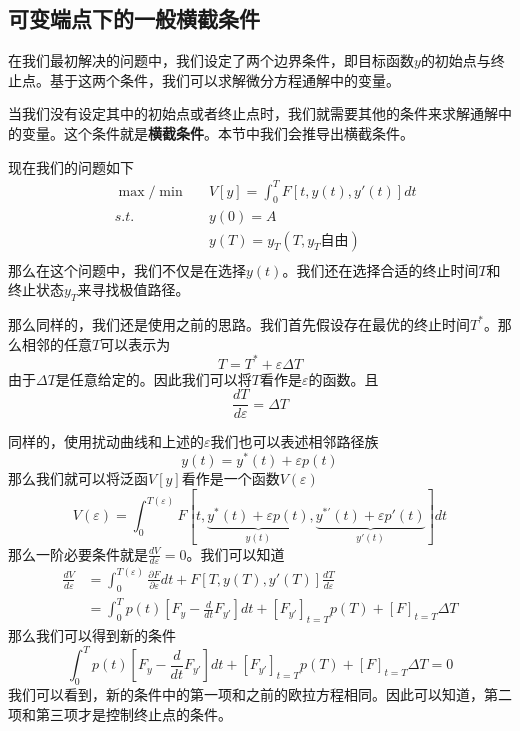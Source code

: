 \documentclass[UTF8,12pt]{ctexart}
\numberwithin{equation}{section} %
\numberwithin{figure}{section}
\numberwithin{table}{section}
\begin{document}
	\subsection{可变端点下的一般横截条件}
	在我们最初解决的问题中，我们设定了两个边界条件，即目标函数$y$的初始点与终止点。基于这两个条件，我们可以求解微分方程通解中的变量。
	
	当我们没有设定其中的初始点或者终止点时，我们就需要其他的条件来求解通解中的变量。这个条件就是\textbf{横截条件}。本节中我们会推导出横截条件。
	
	现在我们的问题如下
	\begin{equation}
		\begin{aligned}
			&\max / \min &&V[y] = \int_{0}^{T}F[t,y(t),y'(t)]dt \\
			&s.t. &&y(0) = A \\
			&  &&y(T) = y_T(T,y_T\text{自由}) \\
		\end{aligned}
	\end{equation}
	那么在这个问题中，我们不仅是在选择$y(t)$。我们还在选择合适的终止时间$T$和终止状态$y_T$来寻找极值路径。
	
	那么同样的，我们还是使用之前的思路。我们首先假设存在最优的终止时间$T^*$。那么相邻的任意$T$可以表示为
	\begin{equation}
		T = T^* + \varepsilon \Delta T
	\end{equation}
	由于$\Delta T$是任意给定的。因此我们可以将$T$看作是$\varepsilon$的函数。且
	\begin{equation}
		\frac{dT}{d\varepsilon} = \Delta T
	\end{equation}
	
	同样的，使用扰动曲线和上述的$\varepsilon$我们也可以表述相邻路径族
	\begin{equation}
		y(t) = y^*(t) + \varepsilon p(t)
	\end{equation}
	那么我们就可以将泛函$V[y]$看作是一个函数$V(\varepsilon)$
	\begin{equation}
		V(\varepsilon) = \int_{0}^{T(\varepsilon)}F[t,\underbrace{y^*(t) + \varepsilon p(t)}_{y(t)},\underbrace{y^{*'}(t) + \varepsilon p'(t)}_{y'(t)}]dt
	\end{equation}
	那么一阶必要条件就是$\frac{dV}{d\varepsilon} = 0$。我们可以知道
	\begin{equation}
		\begin{aligned}
			\frac{dV}{d\varepsilon} &= \int_{0}^{T(\varepsilon)} \frac{\partial F}{\partial \varepsilon}dt + F[T,y(T),y'(T)]\frac{dT}{d\varepsilon} \\
			&=\int_{0}^{T}p(t)[F_y - \frac{d}{dt}F_{y'}]dt + [F_{y'}]_{t = T}p(T) + [F]_{t = T}\Delta T
		\end{aligned}
	\end{equation}
	那么我们可以得到新的条件
	\begin{equation}
		\int_{0}^{T}p(t)[F_y - \frac{d}{dt}F_{y'}]dt + [F_{y'}]_{t = T}p(T) + [F]_{t = T}\Delta T = 0
	\end{equation}
	我们可以看到，新的条件中的第一项和之前的欧拉方程相同。因此可以知道，第二项和第三项才是控制终止点的条件。
\end{document}

